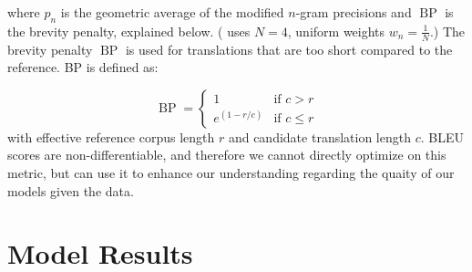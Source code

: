 \documentclass[twoside,twocolumn]{article}
\newlength\mystoreparindent
\newenvironment{myparindent}[1]{%
  \setlength{\mystoreparindent}{\the\parindent}
  \setlength{\parindent}{#1}
  }{%
  \setlength{\parindent}{\mystoreparindent}
}
\begin{document}
\begin{myparindent}{0pt}
\noindent
where $p_n$ is the geometric average of the modified $n$-gram precisions
and $\operatorname{BP}$ is the brevity penalty, explained below.
(\cite{papineni2002bleu} uses $N=4$, uniform weights $w_n = \frac{1}{N}$.)
The brevity penalty $\operatorname{BP}$ is used for translations that are
too short compared to the reference. BP is defined as:

\begin{equation}
  \operatorname{BP} = \begin{cases}
    1 & \text{if } c > r \\
    e^{(1-r/c)} & \text{if } c \leq r
  \end{cases}
\end{equation}
\noindent
with effective reference corpus length $r$ and candidate translation length $c$.
BLEU scores are non-differentiable, and therefore we cannot directly optimize
on this metric, but can use it to enhance our understanding regarding the
quaity of our models given the data.

\section{Model Results}


\end{myparindent}
\end{document}
